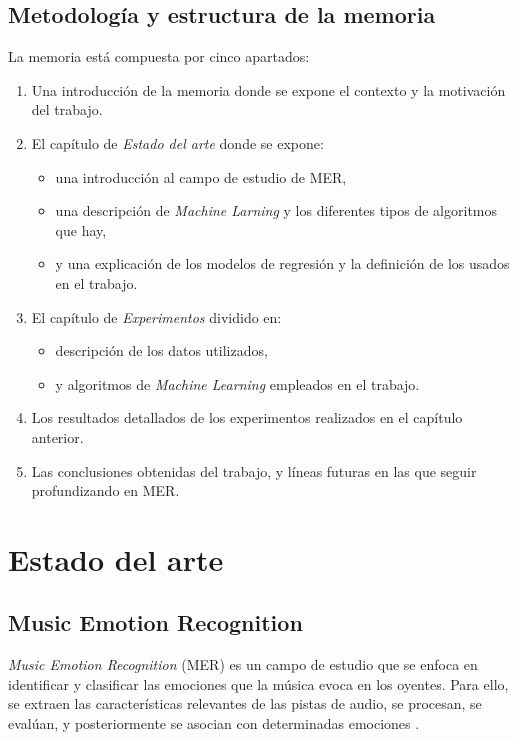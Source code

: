 \documentclass[12pt,a4paper]{article}
\begin{document}
\subsection{Metodología y estructura de la memoria}
La memoria está compuesta por cinco apartados:
\begin{enumerate}
	\item Una introducción de la memoria donde se expone el contexto y la motivación del trabajo.
	\item El capítulo de \textit{Estado del arte} donde se expone:
	\begin{itemize}
		\item una introducción al campo de estudio de MER,
		\item una descripción de \textit{Machine Larning} y los diferentes tipos de algoritmos que hay, 
		\item y una explicación de los modelos de regresión y la definición de los usados en el trabajo.
	\end{itemize}
	\item El capítulo de \textit{Experimentos} dividido en:
	\begin{itemize}
		\item descripción de los datos utilizados,
		\item y algoritmos de \textit{Machine Learning} empleados en el trabajo.
	\end{itemize}
	\item Los resultados detallados de los experimentos realizados en el capítulo anterior.
	\item Las conclusiones obtenidas del trabajo, y líneas futuras en las que seguir profundizando en MER.
\end{enumerate}









\newpage
\section{Estado del arte}
\subsection{Music Emotion Recognition}

\textit{Music Emotion Recognition} (MER) es un campo de estudio que se enfoca en identificar y clasificar las emociones que la música evoca en los oyentes. Para ello, se extraen las características relevantes de las pistas de audio, se procesan, se evalúan, y posteriormente se asocian con determinadas emociones \cite{GomezCanon2021SPM}.
\end{document}
